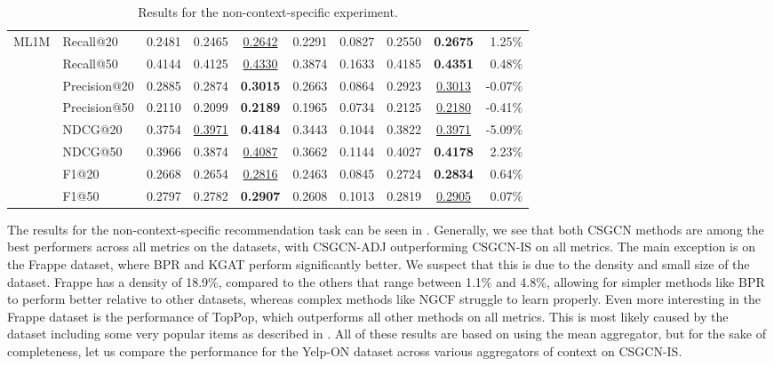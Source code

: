\begin{table*}[]
{\begin{tabular}{@{}l|l|cccccc|cr@{}}
\multirow{8}{*}{ML1M}   & Recall@20    & 0.2481       & 0.2465       & {\ul {0.2642}}    & 0.2291 & 0.0827          & 0.2550 & \textbf{0.2675} & 1.25\% \\
                        & Recall@50    & 0.4144       & 0.4125       & {\ul {0.4330}}    & 0.3874 & 0.1633          & 0.4185 & \textbf{0.4351} & 0.48\% \\
                        & Precision@20 & 0.2885       & 0.2874       & \textbf{0.3015} & 0.2663 & 0.0864          & 0.2923 & {\ul {0.3013}}    & -0.07\% \\
                        & Precision@50 & 0.2110       & 0.2099       & \textbf{0.2189} & 0.1965 & 0.0734          & 0.2125 & {\ul {0.2180}}    & -0.41\% \\
                        & NDCG@20      & 0.3754       & {\ul{ 0.3971}} & \textbf{0.4184} & 0.3443 & 0.1044          & 0.3822 & {\ul {0.3971}}    & -5.09\% \\
                        & NDCG@50      & 0.3966       & 0.3874       & {\ul {0.4087}}    & 0.3662 & 0.1144          & 0.4027 & \textbf{0.4178} & 2.23\% \\
                        & F1@20        & 0.2668       & 0.2654       & {\ul{0.2816}}    & 0.2463 & 0.0845          & 0.2724 & \textbf{0.2834} & 0.64\% \\
                        & F1@50        & 0.2797       & 0.2782       & \textbf{0.2907} & 0.2608 & 0.1013          & 0.2819 & {\ul{0.2905}}    & 0.07\% \\ \bottomrule
\end{tabular}%
}
\caption{Results for the non-context-specific experiment.}
\label{tab:aggregatedresults}
\end{table*}
The results for the non-context-specific recommendation task can be seen in .
Generally, we see that both CSGCN methods are among the best performers across all metrics on the datasets, with CSGCN-ADJ outperforming CSGCN-IS on all metrics.
The main exception is on the Frappe dataset, where BPR and KGAT perform significantly better.
We suspect that this is due to the density and small size of the dataset.
Frappe has a density of 18.9\%, compared to the others that range between 1.1\% and 4.8\%, allowing for simpler methods like BPR to perform better relative to other datasets, whereas complex methods like NGCF struggle to learn properly.
Even more interesting in the Frappe dataset is the performance of TopPop, which outperforms all other methods on all metrics.
This is most likely caused by the dataset including some very popular items as described in .
All of these results are based on using the mean aggregator, but for the sake of completeness, let us compare the performance for the Yelp-ON dataset across various aggregators of context on CSGCN-IS.

